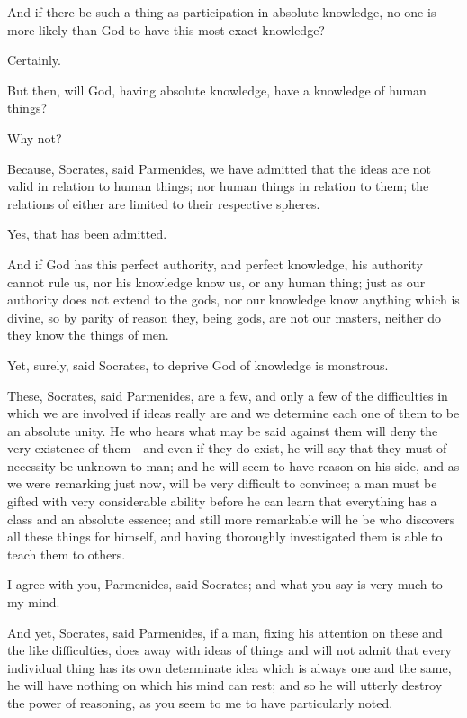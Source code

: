 \documentclass[11pt,letter]{article}
\begin{document}
\par  And if there be such a thing as participation in absolute knowledge, no one is more likely than God to have this most exact knowledge?

\par  Certainly.

\par  But then, will God, having absolute knowledge, have a knowledge of human things?

\par  Why not?

\par  Because, Socrates, said Parmenides, we have admitted that the ideas are not valid in relation to human things; nor human things in relation to them; the relations of either are limited to their respective spheres.

\par  Yes, that has been admitted.

\par  And if God has this perfect authority, and perfect knowledge, his authority cannot rule us, nor his knowledge know us, or any human thing; just as our authority does not extend to the gods, nor our knowledge know anything which is divine, so by parity of reason they, being gods, are not our masters, neither do they know the things of men.

\par  Yet, surely, said Socrates, to deprive God of knowledge is monstrous.

\par  These, Socrates, said Parmenides, are a few, and only a few of the difficulties in which we are involved if ideas really are and we determine each one of them to be an absolute unity. He who hears what may be said against them will deny the very existence of them—and even if they do exist, he will say that they must of necessity be unknown to man; and he will seem to have reason on his side, and as we were remarking just now, will be very difficult to convince; a man must be gifted with very considerable ability before he can learn that everything has a class and an absolute essence; and still more remarkable will he be who discovers all these things for himself, and having thoroughly investigated them is able to teach them to others.

\par  I agree with you, Parmenides, said Socrates; and what you say is very much to my mind.

\par  And yet, Socrates, said Parmenides, if a man, fixing his attention on these and the like difficulties, does away with ideas of things and will not admit that every individual thing has its own determinate idea which is always one and the same, he will have nothing on which his mind can rest; and so he will utterly destroy the power of reasoning, as you seem to me to have particularly noted.
\end{document}
